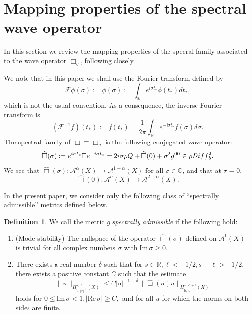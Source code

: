 \documentclass[10pt,a4paper,reqno]{amsart}
\renewcommand{\Im}{\operatorname{Im}}
\renewcommand{\Re}{\operatorname{Re}}
\renewcommand\Re{\operatorname{Re}}
\newcommand{\inv}{^{-1}}
\let\hat\widehat
\theoremstyle{definition}
\newtheorem{definition}[theorem]{Definition}
\theoremstyle{remark}
\numberwithin{equation}{section}
\renewcommand{\Re}{\mathrm{Re}\,}
\renewcommand{\Im}{\mathrm{Im}\,}
\newcommand{\xd}{\delta}
\newcommand{\xs}{\sigma}
\newcommand{\C}{\mathbb C}
\newcommand{\R}{\mathbb R}
\newcommand{\calA}{\mathcal A}
\newcommand{\cA}{\mathcal A}
\newcommand{\calF}{\mathcal F}
\newcommand{\ts}{t_*}
\newcommand{\wh}{\widehat}
\begin{document}
\section{Mapping properties of the spectral wave operator}

In this section we review the mapping properties of the specral family associated to the wave operator $\Box_g$, following closely \cite[Section 2]{Hin22}. 

We note that in this paper we shall use the Fourier transform defined by 
\[
\calF \phi(\sigma) := \hat \phi(\sigma) := \int_{\R} e^{i\sigma\ts}\phi(\ts)d\ts,
\]
which is not the usual convention. As a consequence, the inverse Fourier transform is 
\[
(\calF^{-1} f)(\ts) := \check f(\ts) = \frac{1}{2\pi}\int_{\R} e^{-i\sigma\ts} f(\sigma)d\sigma.
\]
The spectral family of $\Box\equiv\Box_g$ is the following conjugated wave operator:
\begin{equation}
\label{eqn:Boxhatsigma}
    \hat\Box(\xs):= e^{i\xs\ts}\Box e^{-i\xs\ts} = 2i\xs\rho Q + \hat\Box(0) + \xs^2g^{00} \in \rho \rm{Diff}^2_{\rm{b}}.
\end{equation}
We see that $\wh\Box(\sigma)\colon\cA^{\alpha}(X)\to\cA^{1+\alpha}(X)$ for all $\sigma\in\C$, and that at $\xs = 0$, 
\[\wh\Box(0)\colon\cA^{\alpha}(X)\to\cA^{2+\alpha}(X).\]


In the present paper, we consider only the following class of ``spectrally admissible'' metrics defined below. 

\begin{definition}
\label{def:specadm}
We call the metric $g$ \textit{spectrally admissible} if the following hold:
\begin{enumerate}
\item (Mode stability)
The nullspace of the operator $\wh\Box(\xs)$ defined on $\calA^1(X)$ is trivial for all complex numbers $\xs$ with $\Im\xs\ge0$.
\item
There exists a real number $\xd$ such that for $s\in\R, \ell < -1/2, s + \ell>-1/2$, there exists a positive constant $C$ such that the estimate
\begin{equation}
\label{boxhat resolv semiclassical bounds}
	\|u\|_{H^{s,\ell}_{\textrm{b}, |\xs|\inv}(X)} \le C |\xs|^{-1+\xd}\|\wh\Box(\xs)u\|_{H^{s,\ell+1}_{\textrm{b}, |\xs|\inv}(X)}
\end{equation}
holds for $0\le \Im\xs<1, |\Re\xs|\ge C,$ and for all $u$ for which the norms on both sides are finite.
\end{enumerate}
\end{definition}
\end{document}
